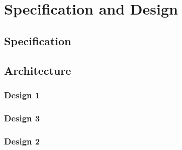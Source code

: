 \documentclass[12pt, conference, final, a4paper, onecolumn, compsoc]{IEEEtran}
\begin{document}
    \subsection*{} %
    \paragraph{}

    \section{Specification and Design}



    \subsection*{Specification}
    \paragraph{}

    \subsection*{Architecture}
    \subsubsection*{Design 1}
    \paragraph*{}

    \paragraph{}
    \subsubsection*{Design 3}

    \subsubsection*{Design 2}
    \paragraph{}
\end{document}
